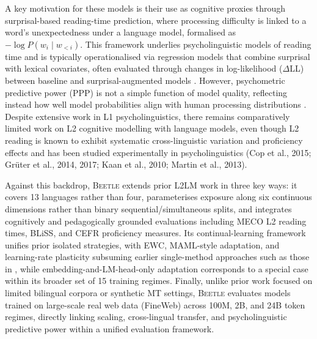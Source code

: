 \documentclass[11pt]{article}
\begin{document}
A key motivation for these models is their use as cognitive proxies through surprisal-based reading-time prediction, where processing difficulty is linked to a word’s unexpectedness under a language model, formalised as $-\log P(w_i \mid w_{<i})$. This framework underlies psycholinguistic models of reading time and is typically operationalised via regression models that combine surprisal with lexical covariates, often evaluated through changes in log-likelihood ($\Delta$LL) between baseline and surprisal-augmented models \citep{wilcox2020predictive, kaye2025sentence}. However, psychometric predictive power (PPP) is not a simple function of model quality, reflecting instead how well model probabilities align with human processing distributions \citep{de-varda-marelli-2022-effects, goodkind-bicknell, demberg-keller, shain2019, shain2021, hoover2022}. Despite extensive work in L1 psycholinguistics, there remains comparatively limited work on L2 cognitive modelling with language models, even though L2 reading is known to exhibit systematic cross-linguistic variation and proficiency effects \citep{hillert1998sentence, meister2021revisiting, kuribayashi-etal-2021-lower} and has been studied experimentally in psycholinguistics (Cop et al., 2015; Grüter et al., 2014, 2017; Kaan et al., 2010; Martin et al., 2013). 

Against this backdrop, \textsc{Beetle} extends prior L2LM work in three key ways: it covers 13 languages rather than four, parameterises exposure along six continuous dimensions rather than binary sequential/simultaneous splits, and integrates cognitively and pedagogically grounded evaluations including MECO L2 reading times, BLiSS, and CEFR proficiency measures. Its continual-learning framework unifies prior isolated strategies, with EWC, MAML-style adaptation, and learning-rate plasticity subsuming earlier single-method approaches such as those in \citet{constantinescu2025investigating}, while embedding-and-LM-head-only adaptation corresponds to a special case within its broader set of 15 training regimes. Finally, unlike prior work focused on limited bilingual corpora or synthetic MT settings, \textsc{Beetle} evaluates models trained on large-scale real web data (FineWeb) across 100M, 2B, and 24B token regimes, directly linking scaling, cross-lingual transfer, and psycholinguistic predictive power within a unified evaluation framework.
\end{document}
